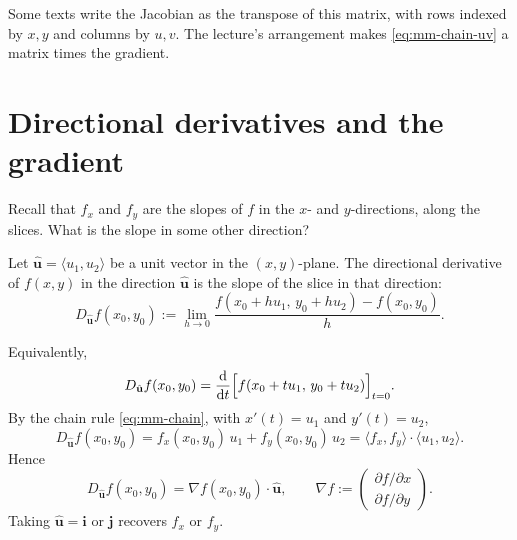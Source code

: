 \begin{remark}
Some texts write the Jacobian as the transpose of this matrix, with rows
indexed by $x,y$ and columns by $u,v$. The lecture's arrangement makes
\eqref{eq:mm-chain-uv} a matrix times the gradient.
\end{remark}

\section{Directional derivatives and the gradient}

Recall that $f_x$ and $f_y$ are the slopes of $f$ in the $x$- and
$y$-directions, along the slices. What is the slope in some other direction?

\begin{definition}
Let $\hat{\mathbf u}=\langle u_1,u_2\rangle$ be a unit vector in the $(x,y)$-plane.
The directional derivative of $f(x,y)$ in the direction $\hat{\mathbf u}$ is
the slope of the slice in that direction:
\[
 D_{\hat{\mathbf u}}f(x_0,y_0)
 :=\lim_{h\to0}\frac{f(x_0+hu_1,\,y_0+hu_2)-f(x_0,y_0)}{h}.
\]
\end{definition}

Equivalently,
\[
 D_{\hat{\mathbf u}}f(x_0,y_0)
 =\frac{\mathrm d}{\mathrm dt}\Bigl[f(x_0+tu_1,\,y_0+tu_2)\Bigr]_{t=0}.
\]
By the chain rule \eqref{eq:mm-chain}, with $x'(t)=u_1$ and $y'(t)=u_2$,
\[
 D_{\hat{\mathbf u}}f(x_0,y_0)
 =f_x(x_0,y_0)\,u_1+f_y(x_0,y_0)\,u_2
 =\langle f_x,f_y\rangle\cdot\langle u_1,u_2\rangle.
\]
Hence
\[
 \boxed{D_{\hat{\mathbf u}}f(x_0,y_0)=\nabla f(x_0,y_0)\cdot\hat{\mathbf u}},
 \qquad
 \nabla f:=\begin{pmatrix} \partial f/\partial x\\ \partial f/\partial y\end{pmatrix}.
\]
Taking $\hat{\mathbf u}=\mathbf i$ or $\mathbf j$ recovers $f_x$ or $f_y$.

